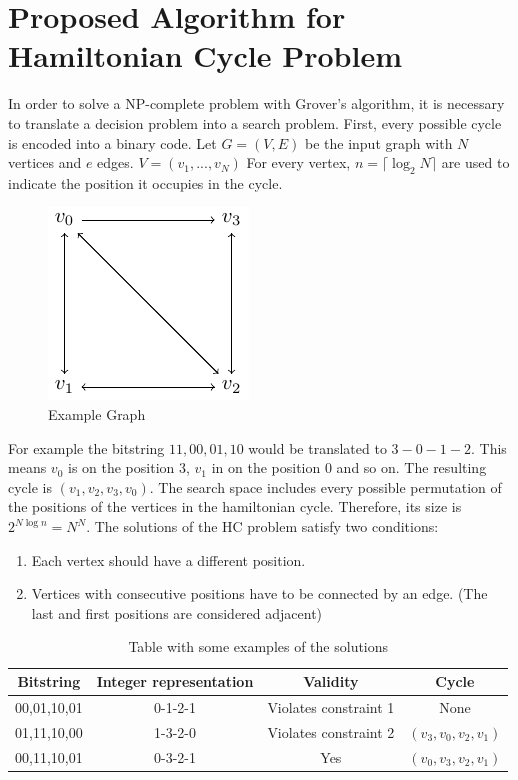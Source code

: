 \documentclass[10pt,a4paper]{article}
\begin{document}
\section{Proposed Algorithm for Hamiltonian Cycle Problem}
In order to solve a NP-complete problem with Grover's algorithm, it is necessary to translate a decision problem into a search problem. First, every possible cycle is encoded into a binary code. Let $G=(V, E)$ be the input graph with $N$ vertices and $e$ edges. $V = (v_1, ..., v_N)$ For every vertex, $n = \lceil \log_2 N \rceil$ are used to indicate the position it occupies in the cycle.\\
\begin{figure}[hbtp]
\centering
\includegraphics[scale=1]{figures/ExampleGraph.pdf}
\caption{Example Graph}
\end{figure}

For example the bitstring $11,00,01,10$ would be translated to $3-0-1-2$. This means $v_0$ is on the position $3$, $v_1$ in on the position $0$ and so on. The resulting cycle is $(v_1, v_2, v_3, v_0)$.
The search space includes every possible permutation of the positions of the vertices in the hamiltonian cycle. Therefore, its size is $2^{N\log n} = N^N$. The solutions of the HC problem satisfy two conditions:
\begin{enumerate}
\item Each vertex should have a different position.
\item Vertices with consecutive positions have to be connected by an edge. (The last and first positions are considered adjacent)
\end{enumerate}
\begin{table}[htbp]
    \centering
    \begin{tabular}{|c|c|c|c|}
        \hline
        Bitstring & Integer representation & Validity & Cycle \\
        \hline
        00,01,10,01 & 0-1-2-1 & Violates constraint 1 & None \\
        01,11,10,00 & 1-3-2-0 & Violates constraint 2 & $(v_3, v_0, v_2, v_1)$ \\
        00,11,10,01 & 0-3-2-1 & Yes & $(v_0, v_3, v_2, v_1)$\\
        \hline
    \end{tabular}
    \label{tab:example}
    \caption{Table with some examples of the solutions}
\end{table}
\end{document}
